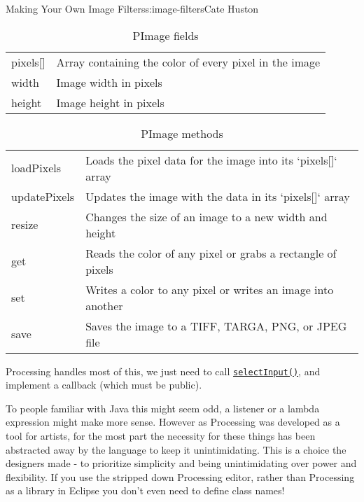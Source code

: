 \begin{aosachapter}{Making Your Own Image Filters}{s:image-filters}{Cate Huston}
\begin{table}
\centering
{\footnotesize
{}
\begin{tabular}{ll}
\hline
pixels[] & Array containing the color of every pixel in the image \\
width & Image width in pixels \\
height & Image height in pixels \\
\hline
\end{tabular}
}
\caption{PImage fields}
\label{500l.imagefilters.pimagefields}
\end{table}

\begin{table}
\centering
{\footnotesize
{}
\begin{tabular}{ll}
\hline
loadPixels & Loads the pixel data for the image into its `pixels[]` array \\
updatePixels & Updates the image with the data in its `pixels[]` array \\
resize & Changes the size of an image to a new width and height \\
get & Reads the color of any pixel or grabs a rectangle of pixels \\
set & Writes a color to any pixel or writes an image into another \\
save & Saves the image to a TIFF, TARGA, PNG, or JPEG file \\
\hline
\end{tabular}
}
\caption{PImage methods}
\label{500l.imagefilters.pimagemethods}
\end{table}

\label{file-chooser}

Processing handles most of this, we just need to call
\href{http://www.processing.org/reference/selectInput_.html}{\texttt{selectInput()}},
and implement a callback (which must be public).

To people familiar with Java this might seem odd, a listener or a lambda
expression might make more sense. However as Processing was developed as
a tool for artists, for the most part the necessity for these things has
been abstracted away by the language to keep it unintimidating. This is
a choice the designers made - to prioritize simplicity and being
unintimidating over power and flexibility. If you use the stripped down
Processing editor, rather than Processing as a library in Eclipse you
don't even need to define class names!


\end{aosachapter}
